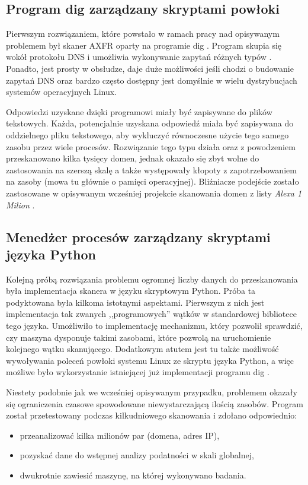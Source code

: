 \subsection{Program dig zarządzany skryptami powłoki}
\label{dig_sh}
\noindent Pierwszym rozwiązaniem, które powstało w ramach pracy nad opisywanym problemem był skaner AXFR oparty na programie
dig \cite{isc}. Program skupia się wokół protokołu DNS i umożliwia wykonywanie zapytań różnych typów \cite{Liu:2006:DB:1197828}.
Ponadto, jest prosty w obsłudze, daje duże możliwości jeśli chodzi o budowanie zapytań DNS oraz bardzo często dostępny jest
domyślnie w wielu dystrybucjach systemów operacyjnych Linux.

Odpowiedzi uzyskane dzięki programowi miały być zapisywane do plików tekstowych. Każda, potencjalnie uzyskana odpowiedź miała
być zapisywana do oddzielnego pliku tekstowego, aby wykluczyć równoczesne użycie tego samego zasobu przez wiele procesów.
Rozwiązanie tego typu działa oraz z powodzeniem przeskanowano kilka tysięcy domen, jednak okazało się zbyt wolne do zastosowania
na szerszą skalę a także występowały kłopoty z zapotrzebowaniem na zasoby (mowa tu głównie o pamięci operacyjnej). Bliźniacze
podejście zostało zastosowane w opisywanym wcześniej projekcie skanowania domen z listy \textit{Alexa 1 Milion} \cite{scans.io}.

\subsection{Menedżer procesów zarządzany skryptami języka Python}
\noindent Kolejną próbą rozwiązania problemu ogromnej liczby danych do przeskanowania była implementacja skanera w języku skryptowym Python.
Próba ta podyktowana była kilkoma istotnymi aspektami. Pierwszym z nich jest implementacja tak zwanych ,,programowych'' wątków w
standardowej bibliotece tego języka. Umożliwiło to implementację mechanizmu, który pozwolił sprawdzić, czy maszyna dysponuje
takimi zasobami, które pozwolą na uruchomienie kolejnego wątku skanującego. Dodatkowym atutem jest tu także możliwość wywoływania
poleceń powłoki systemu Linux ze skryptu języka Python, a więc możliwe było wykorzystanie istniejącej już implementacji programu
dig \cite{isc}.

Niestety podobnie jak we wcześniej opisywanym przypadku, problemem okazały się ograniczenia czasowe spowodowane niewystarczającą
ilością zasobów. Program został przetestowany podczas kilkudniowego skanowania i zdołano odpowiednio:
\begin{itemize}
	\item przeanalizować kilka milionów par (domena, adres IP),
	\item pozyskać dane do wstępnej analizy podatności w skali globalnej,
	\item dwukrotnie zawiesić maszynę, na której wykonywano badania.
\end{itemize}


